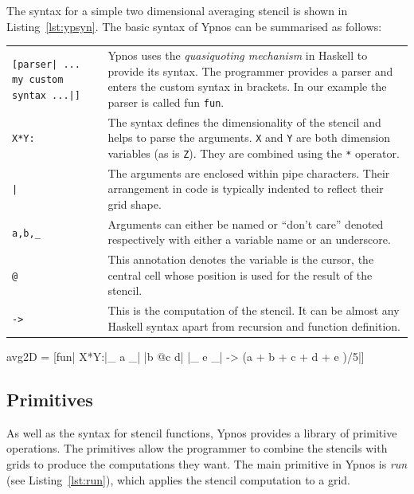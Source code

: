 \documentclass[12pt,a4paper,twoside]{scrbook}
\begin{document}
The syntax for a simple two dimensional averaging stencil is shown in
Listing~\ref{lst:ypsyn}. The basic syntax of Ypnos can be summarised as follows:

\begin{tabular}{p{} p{}}

\texttt{[parser| ... my custom syntax ...|]} & Ypnos uses the
\emph{quasiquoting mechanism} in Haskell to provide its syntax. The programmer
provides a parser and enters the custom syntax in brackets. In our example the
parser is called fun \texttt{fun}.  \\

\texttt{X*Y:} & The syntax defines the dimensionality of the stencil and helps
to parse the arguments. \texttt{X} and \texttt{Y} are both dimension variables
(as is \texttt{Z}). They are combined using the \texttt{*} operator.  \\

\texttt{|} & The arguments are enclosed within pipe characters.  Their
arrangement in code is typically indented to reflect their grid shape.  \\

\texttt{a,b,\_} & Arguments can either be named or ``don't care'' denoted
respectively with either a variable name or an underscore.  \\

\texttt{@} & This annotation denotes the variable is the cursor, the central
cell whose position is used for the result of the stencil.  \\

\texttt{->} & This is the computation of the stencil. It can be almost any
Haskell syntax apart from recursion and function definition.  \\

\end{tabular}

\begin{hflisting}[label={lst:ypsyn},caption={A simple mean function. Computes
    the mean of the neighbourhood of cells.}]
avg2D = [fun| X*Y:|_  a _|
                  |b @c d|
                  |_  e _| -> (a + b + c + d + e )/5|]
\end{hflisting}

\subsection{Primitives}

As well as the syntax for stencil functions, Ypnos provides a library of
primitive operations. The primitives allow the programmer to combine the
stencils with grids to produce the computations they want. The main primitive in
Ypnos is \emph{run} (see Listing~\ref{lst:run}), which applies the stencil
computation to a grid.
\end{document}
